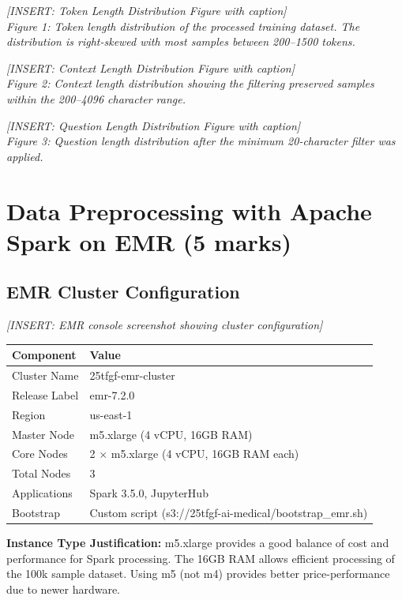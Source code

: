 \documentclass[11pt,a4paper]{article}
\begin{document}
\textit{[INSERT: Token Length Distribution Figure with caption]}\\
\textit{Figure 1: Token length distribution of the processed training dataset. The distribution is right-skewed with most samples between 200--1500 tokens.}

\textit{[INSERT: Context Length Distribution Figure with caption]}\\
\textit{Figure 2: Context length distribution showing the filtering preserved samples within the 200--4096 character range.}

\textit{[INSERT: Question Length Distribution Figure with caption]}\\
\textit{Figure 3: Question length distribution after the minimum 20-character filter was applied.}

\section{Data Preprocessing with Apache Spark on EMR (5 marks)}

\subsection{EMR Cluster Configuration}

\textit{[INSERT: EMR console screenshot showing cluster configuration]}

\begin{table}[H]
\centering
\begin{tabular}{@{}ll@{}}
\toprule
\textbf{Component} & \textbf{Value} \\
\midrule
Cluster Name & 25tfgf-emr-cluster \\
Release Label & emr-7.2.0 \\
Region & us-east-1 \\
Master Node & m5.xlarge (4 vCPU, 16GB RAM) \\
Core Nodes & 2 $\times$ m5.xlarge (4 vCPU, 16GB RAM each) \\
Total Nodes & 3 \\
Applications & Spark 3.5.0, JupyterHub \\
Bootstrap & Custom script (s3://25tfgf-ai-medical/bootstrap\_emr.sh) \\
\bottomrule
\end{tabular}
\end{table}

\textbf{Instance Type Justification:} m5.xlarge provides a good balance of cost and performance for Spark processing. The 16GB RAM allows efficient processing of the 100k sample dataset. Using m5 (not m4) provides better price-performance due to newer hardware.
\end{document}
